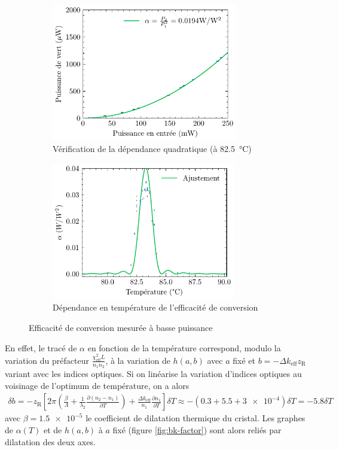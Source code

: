 \documentclass[11pt,a4paper] { article}
\newcommand{\pdv}[2]{\frac{\partial #1}{\partial #2}}
\newcommand{\zr}{z_\mathsc{R}}
\newcommand{\chie}{\chi_\mathsc{eff}}
\newcommand{\dke}{\Delta k_\mathsc{eff}}
\newcommand{\mathsc}[1]{\mathrm{\scriptscriptstyle {#1}}}
\begin{document}
\begin{figure}[htpb]
\centering
\hspace*{-0.4cm}
\begin{subfigure}{0.48\textwidth}
    \centering
    \includegraphics[height=6cm]{../donnees/conversion basse puissance 82.5 C.pdf}
    \caption{Vérification de la dépendance quadratique (à \SI{82.5}{\celsius})}
    \label{fig:quadra}
\end{subfigure}
\begin{subfigure}{0.48\textwidth}
	\centering
	\includegraphics[height=6cm]{./img/alpha bp.pdf}
	\caption{Dépendance en température de l'efficacité de conversion}
	\label{fig:alphabp}
\end{subfigure}
\caption{Efficacité de conversion mesurée à basse puissance}
\end{figure}

En effet, le tracé de $\alpha$ en fonction de la température correspond, modulo la variation du préfacteur $\frac{\chie^2 L}{n_1 n_2}$, à la variation de $h(a,b)$ avec $a$ fixé et $b=-\Delta k_\mathsc{eff} \zr$ variant avec les indices optiques. Si on linéarise la variation d'indices optiques au voisinage de l'optimum de température, on a alors 
\begin{align}
	\delta b = - \zr \left[ 2\pi \left( \frac{\beta}{\Lambda} + \frac{1}{\lambda_2} \pdv{(n_2-n_1)}{T}  \right) + \frac{\dke}{n_1} \pdv{n_1}{T} \right] \delta T \approx -\left(0.3+5.5+\num{3e-4}\right) \delta T = - 5.8 \delta T
\end{align}
avec $\beta = \num{1.5e-5}$ le coefficient de dilatation thermique du cristal.
Les graphes de $\alpha(T)$ et de $h(a,b)$ à $a$ fixé (figure \ref{fig:bk-factor}) sont alors reliés par dilatation des deux axes.
\end{document}
